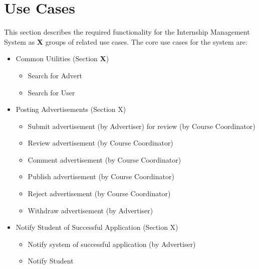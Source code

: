 \section{Use Cases}
\label{sec:usecases}

This section describes the required functionality for the Internship Management System as \textbf{X} groups of related use cases. 
The core use cases for the system are:

\begin{itemize}
  \item{Common Utilities (Section \textbf{X})}
    \begin{itemize}
      \item{Search for Advert}
      \item{Search for User}
    \end{itemize}
  \item{Posting Advertisements (Section X)}
    \begin{itemize}
    \item{Submit advertisement (by Advertiser) for review (by Course Coordinator)}
    \item{Review advertisement (by Course Coordinator)}
    \item{Comment advertisement (by Course Coordinator)}
    \item{Publish advertisement (by Course Coordinator)}
    \item{Reject advertisement (by Course Coordinator)}
    \item{Withdraw advertisement (by Advertiser)}
    \end{itemize}
  \item{Notify Student of Successful Application (Section X)}
    \begin{itemize}
      \item{Notify system of successful application (by Advertiser)}
      \item{Notify Student}
    \end{itemize}
\end{itemize}
